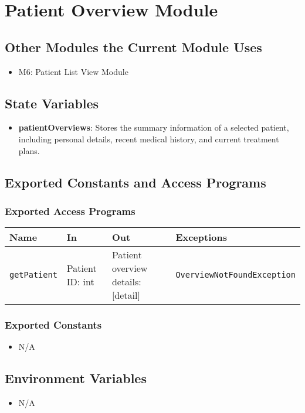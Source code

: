 \documentclass[12pt, titlepage]{article}
\begin{document}
\newpage
\section{Patient Overview Module}

\subsection{Other Modules the Current Module Uses}
\begin{itemize}
  \item M6: Patient List View Module
\end{itemize}

\subsection{State Variables}
\begin{itemize}
\item \textbf{patientOverviews}: Stores the summary information of a selected patient, including personal details, recent medical history, and current treatment plans.
\end{itemize}

\subsection{Exported Constants and Access Programs}
\subsubsection{Exported Access Programs}
\begin{tabular}{|l|l|l|l|}
    \hline
    \textbf{Name} & \textbf{In} & \textbf{Out} & \textbf{Exceptions} \\
    \hline 
    \texttt{getPatient} & Patient ID: int & Patient overview details: [detail] & \texttt{OverviewNotFoundException} \\
    \hline
\end{tabular}

\subsubsection{Exported Constants}
\begin{itemize}
\item N/A
\end{itemize}

\subsection{Environment Variables}
\begin{itemize}
\item N/A
\end{itemize}
\end{document}
